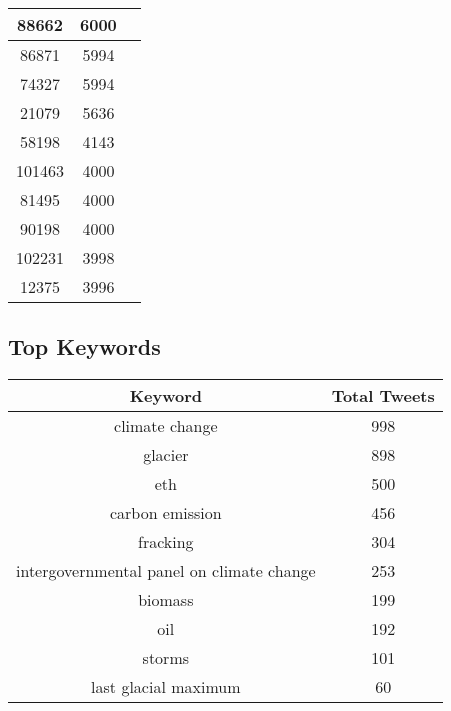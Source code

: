 \documentclass{article}\usepackage[T1]{fontenc}
\begin{document}
\begin{tabular}{|c|c|c|}
 \hline
88662 & 6000\\ 
 \hline
86871 & 5994\\ 
 \hline
74327 & 5994\\ 
 \hline
21079 & 5636\\ 
 \hline
58198 & 4143\\ 
 \hline
101463 & 4000\\ 
 \hline
81495 & 4000\\ 
 \hline
90198 & 4000\\ 
 \hline
102231 & 3998\\ 
 \hline
12375 & 3996\\ 
 \hline
\end{tabular}\subsection*{Top Keywords}\begin{tabular}{|c|c|}         \hline         Keyword & Total Tweets \\ 
 \hline
climate change & 998\\ 
 \hline
glacier & 898\\ 
 \hline
eth & 500\\ 
 \hline
carbon emission & 456\\ 
 \hline
fracking & 304\\ 
 \hline
intergovernmental panel on climate change & 253\\ 
 \hline
biomass & 199\\ 
 \hline
oil & 192\\ 
 \hline
storms & 101\\ 
 \hline
last glacial maximum & 60\\ 
 \hline
\end{tabular}
\end{document}
